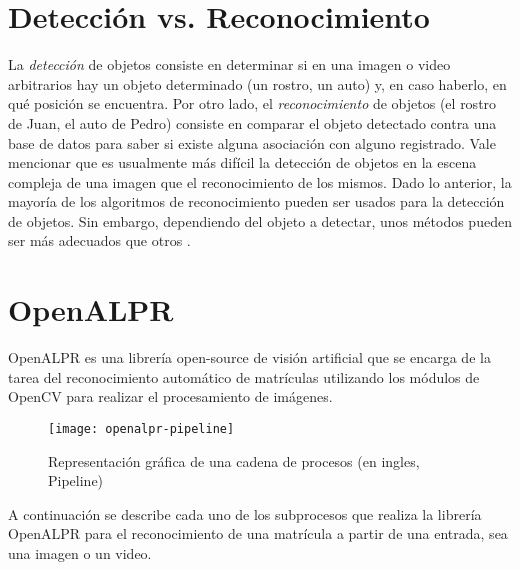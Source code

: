 \section{Detección vs. Reconocimiento}
La\textit{ detección} de objetos consiste en determinar si en una imagen o video arbitrarios hay un objeto determinado (un rostro, un auto) y, en caso haberlo, en qué posición se encuentra. Por otro lado, el \textit{reconocimiento }de objetos (el rostro de Juan, el auto de Pedro) consiste en comparar el objeto detectado contra una base de datos para saber si existe alguna asociación con alguno registrado. Vale mencionar que es usualmente más difícil la detección de objetos en la escena compleja de una imagen que el reconocimiento de los mismos. Dado lo anterior, la mayoría de los algoritmos de reconocimiento pueden ser usados para la detección de objetos. Sin embargo, dependiendo del objeto a detectar, unos métodos pueden ser más adecuados que otros \cite{Ekvall2005-ut}.
\section{OpenALPR}
OpenALPR es una librería open-source de visión artificial que se encarga de la tarea del reconocimiento automático de matrículas utilizando los módulos de OpenCV para realizar el procesamiento de imágenes.
  
  \begin{figure}[H]
        \centering
        \texttt{[image: openalpr-pipeline]}
        \caption{Representación gráfica de una cadena de procesos (en ingles, Pipeline) \protect\cite{Saini2015-yp}}
        \label{fig:openalpr-pipeline}
\end{figure}
    
A continuación se describe cada uno de los subprocesos que realiza la librería OpenALPR para el reconocimiento de una matrícula a partir de una entrada, sea una imagen o un video. 

